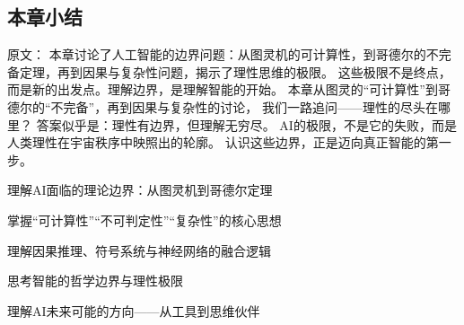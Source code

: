 \subsection{本章小结}

原文：
本章讨论了人工智能的边界问题：从图灵机的可计算性，到哥德尔的不完备定理，再到因果与复杂性问题，揭示了理性思维的极限。
这些极限不是终点，而是新的出发点。理解边界，是理解智能的开始。
本章从图灵的“可计算性”到哥德尔的“不完备”，再到因果与复杂性的讨论，  
我们一路追问——理性的尽头在哪里？  
答案似乎是：理性有边界，但理解无穷尽。  
AI的极限，不是它的失败，而是人类理性在宇宙秩序中映照出的轮廓。  
认识这些边界，正是迈向真正智能的第一步。



\begin{introduction}
  \item 理解AI面临的理论边界：从图灵机到哥德尔定理  
  \item 掌握“可计算性”“不可判定性”“复杂性”的核心思想  
  \item 理解因果推理、符号系统与神经网络的融合逻辑  
  \item 思考智能的哲学边界与理性极限  
  \item 理解AI未来可能的方向——从工具到思维伙伴
\end{introduction}





